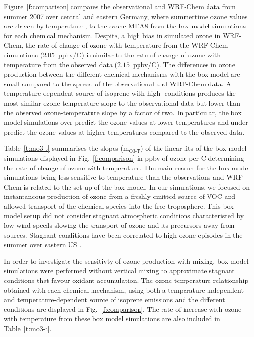 Figure~\ref{f:comparison} compares the observational and WRF-Chem data from summer 2007 over central and eastern Germany, where summertime ozone values are driven by temperature \citep{Otero:2016}, to the ozone MDA8 from the box model simulations for each chemical mechanism.
Despite, a high bias in simulated ozone in WRF-Chem, the rate of change of ozone with temperature from the WRF-Chem simulations ($2.05$~ppbv/\degree C) is similar to the rate of change of ozone with temperature from the observed data ($2.15$~ppbv/\degree C).
The differences in ozone production between the different chemical mechanisms with the box model are small compared to the spread of the observational and WRF-Chem data.
A temperature-dependent source of isoprene with high- conditions produces the most similar ozone-temperature slope to the observational data but lower than the observed ozone-temperature slope by a factor of two.
In particular, the box model simulations over-predict the ozone values at lower temperatures and under-predict the ozone values at higher temperatures compared to the observed data.

Table~\ref{t:mo3-t} summarises the slopes (m$_{\text{O3-T}}$) of the linear fits of the box model simulations displayed in Fig.~\ref{f:comparison} in ppbv of ozone per \degree C determining the rate of change of ozone with temperature.
The main reason for the box model simulations being less sensitive to temperature than the observations and WRF-Chem is related to the set-up of the box model.
In our simulations, we focused on instantaneous production of ozone from a freshly-emitted source of VOC and allowed transport of the chemical species into the free troposphere.
This box model setup did not consider stagnant atmospheric conditions characteristed by low wind speeds slowing the transport of ozone and its precursors away from sources.
Stagnant conditions have been correlated to high-ozone episodes in the summer over eastern US \citep{Jacob:1993}.

In order to investigate the sensitivty of ozone production with mixing, box model simulations were performed without vertical mixing to approximate stagnant conditions that favour oxidant accumulation.
The ozone-temperature relationship obtained with each chemical mechanism, using both a temperature-independent and temperature-dependent source of isoprene emissions and the different  conditions are displayed in Fig.~\ref{f:comparison}.
The rate of increase with ozone with temperature from these box model simulations are also included in Table~\ref{t:mo3-t}.

